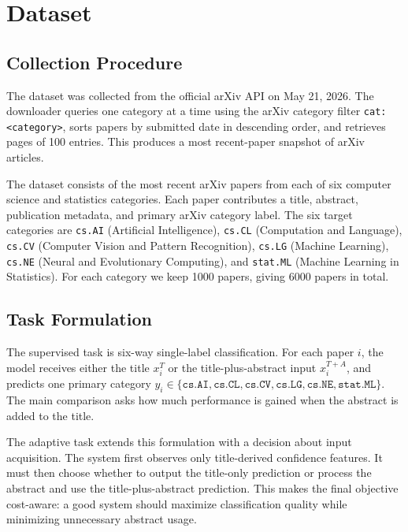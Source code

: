 \documentclass{article}
\begin{document}
\section{Dataset}

\subsection{Collection Procedure}

The dataset was collected from the official arXiv API \cite{arxivapi} on May 21, 2026.
The downloader queries one category at a time using the arXiv category filter \texttt{cat:<category>}, sorts papers by submitted date in descending order, and retrieves pages of 100 entries. This produces a most recent-paper snapshot of arXiv articles. 

The dataset consists of the most recent arXiv papers from each of six computer science and statistics categories. Each paper contributes a title, abstract, publication metadata, and primary arXiv category label. The six target categories are \texttt{cs.AI} (Artificial Intelligence), \texttt{cs.CL} (Computation and Language), \texttt{cs.CV} (Computer Vision and Pattern Recognition), \texttt{cs.LG} (Machine Learning), \texttt{cs.NE} (Neural and Evolutionary Computing), and \texttt{stat.ML} (Machine Learning in Statistics). For each category we keep 1000 papers, giving 6000 papers in total.

\subsection{Task Formulation}

The supervised task is six-way single-label classification. For each paper \(i\), the model receives either the title \(x_i^T\) or the title-plus-abstract input \(x_i^{T+A}\), and predicts one primary category \(y_i \in \{\texttt{cs.AI}, \texttt{cs.CL}, \texttt{cs.CV}, \texttt{cs.LG}, \texttt{cs.NE}, \texttt{stat.ML}\}\). The main comparison asks how much performance is gained when the abstract is added to the title.

The adaptive task extends this formulation with a decision about input acquisition. The system first observes only title-derived confidence features. It must then choose whether to output the title-only prediction or process the abstract and use the title-plus-abstract prediction. This makes the final objective cost-aware: a good system should maximize classification quality while minimizing unnecessary abstract usage.
\end{document}
